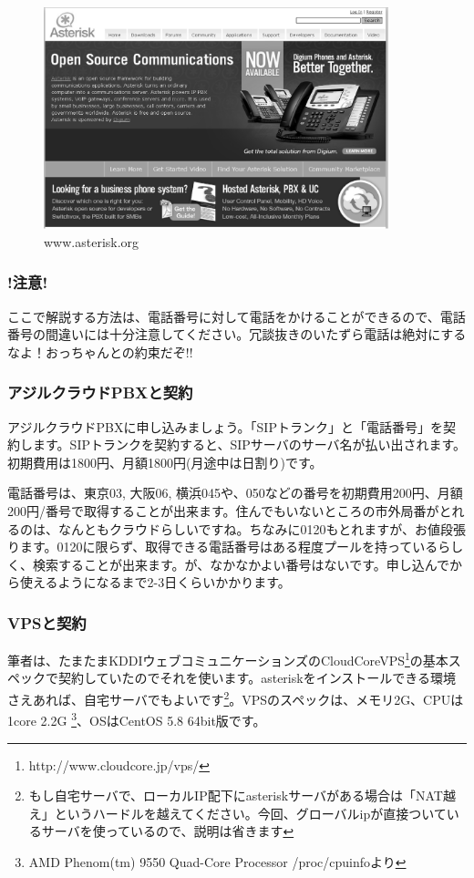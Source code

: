 \begin{figure}[htbp]
 \begin{center}
  \includegraphics[width=100mm]{tboffice-asterisk/img/asterisk-site.eps}
 \end{center}
 \caption{www.asterisk.org}
 \label{fig:asterisk-site}
\end{figure}


\subsubsection{\textbf{!注意!}}
ここで解説する方法は、電話番号に対して電話をかけることができるので、電話番号の間違いには十分注意してください。冗談抜きのいたずら電話は絶対にするなよ！おっちゃんとの約束だぞ!!

\subsubsection{アジルクラウドPBXと契約}
アジルクラウドPBXに申し込みましょう。「SIPトランク」と「電話番号」を契約します。SIPトランクを契約すると、SIPサーバのサーバ名が払い出されます。初期費用は1800円、月額1800円(月途中は日割り)です。

電話番号は、東京03, 大阪06, 横浜045や、050などの番号を初期費用200円、月額200円/番号で取得することが出来ます。住んでもいないところの市外局番がとれるのは、なんともクラウドらしいですね。ちなみに0120もとれますが、お値段張ります。0120に限らず、取得できる電話番号はある程度プールを持っているらしく、検索することが出来ます。が、なかなかよい番号はないです。申し込んでから使えるようになるまで2-3日くらいかかります。

\subsubsection{VPSと契約}
筆者は、たまたまKDDIウェブコミュニケーションズのCloudCoreVPS\footnote{http://www.cloudcore.jp/vps/}の基本スペックで契約していたのでそれを使います。asteriskをインストールできる環境さえあれば、自宅サーバでもよいです\footnote{もし自宅サーバで、ローカルIP配下にasteriskサーバがある場合は「NAT越え」というハードルを越えてください。今回、グローバルipが直接ついているサーバを使っているので、説明は省きます}。VPSのスペックは、メモリ2G、CPUは1core 2.2G \footnote{AMD Phenom(tm) 9550 Quad-Core Processor /proc/cpuinfoより}、OSはCentOS 5.8 64bit版です。

